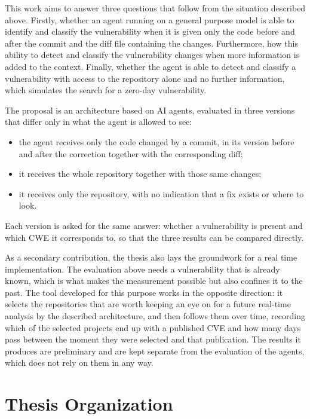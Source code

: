     This work aims to answer three questions that follow from the situation described above.
    Firstly, whether an agent running on a general purpose model is able to identify and classify the
    vulnerability when it is given only the code before and after the commit and the diff file
    containing the changes.
    Furthermore, how this ability to detect and classify the vulnerability changes when more information is
    added to the context.
    Finally, whether the agent is able to detect and classify a vulnerability with access to the
    repository alone and no further information, which simulates the search for a zero-day vulnerability.

    The proposal is an architecture based on AI agents, evaluated in three versions that differ
    only in what the agent is allowed to see:
    \begin{itemize}
        \item the agent receives only the code changed by a commit, in its version before and
              after the correction together with the corresponding diff;
        \item it receives the whole repository together with those same changes;
        \item it receives only the repository, with no indication that a fix exists or where to
              look.
    \end{itemize}

    Each version is asked for the same answer: whether a vulnerability is present and which
    CWE it corresponds to, so that the three results can be compared directly.

    As a secondary contribution, the thesis also lays the groundwork for a real time implementation.
    The evaluation above needs a vulnerability that is already known, which is what makes the
    measurement possible but also confines it to the past.
    The tool developed for this purpose works in the opposite direction: it selects the
    repositories that are worth keeping an eye on for a future real-time analysis by the described architecture,
     and then follows them over time, recording which
    of the selected projects end up with a published CVE and how many days pass between the moment
    they were selected and that publication.
    The results it produces are preliminary and are kept separate from the evaluation of the
    agents, which does not rely on them in any way.
    


\section[Thesis Organization]{Thesis Organization}

